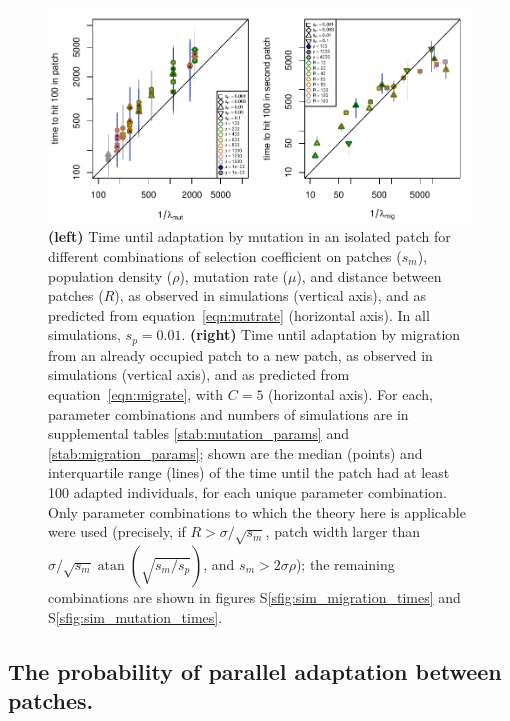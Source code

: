 \documentclass{article}
\newcommand{\revpoint}[2]{}
\DeclareMathOperator{\atan}{atan}
\begin{document}
\begin{figure}[ht!]
  \begin{center}
      \includegraphics{times-predicted-observed}
  \end{center}
  \caption{
      \textbf{(left)} 
      Time until adaptation by mutation in an isolated patch for different combinations
      of selection coefficient on patches ($s_m$), 
      population density ($\rho$),
      mutation rate ($\mu$),
      and distance between patches ($R$), \revpoint{3}{3}
      as observed in simulations (vertical axis),
      and as predicted from equation~\eqref{eqn:mutrate} (horizontal axis).
      In all simulations, $s_p=0.01$.
      \textbf{(right)} 
      Time until adaptation by migration from an already occupied patch to a new patch,
      as observed in simulations (vertical axis),
      and as predicted from equation~\eqref{eqn:migrate}, with $C=5$ (horizontal axis).
      For each,
      parameter combinations and numbers of simulations are in supplemental tables \ref{stab:mutation_params} and \ref{stab:migration_params};
      shown are the median (points) and interquartile range (lines)
      of the time until the patch had at least 100 adapted individuals,
      for each unique parameter combination.
      Only parameter combinations to which the theory here is applicable were used
      (precisely, if
      $R > \sigma/\sqrt{s_m}$, 
      patch width larger than $\sigma/\sqrt{s_m} \atan(\sqrt{s_m/s_p})$, 
      and $s_m > 2 \sigma \rho$);
      the remaining combinations are shown in figures
      S\ref{sfig:sim_migration_times} and S\ref{sfig:sim_mutation_times}.
  }   \label{fig:sim_times}
\end{figure}




\subsection[Probability of Parallel Adaptation]{The probability of parallel adaptation between patches.} 
\label{ss:probparallel}
\end{document}
